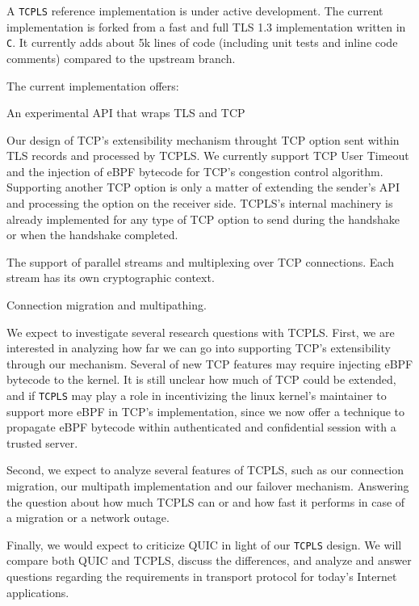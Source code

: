 
A \texttt{TCPLS} reference implementation is under active development. The
current implementation is forked from a fast and full
TLS 1.3 implementation written in \texttt{C}. It currently adds about 5k lines
of code (including unit tests and inline code comments) compared to the upstream branch.

The current implementation offers:
\begin{inparaenum}
  \item An experimental API that wraps TLS and TCP
  \item Our design of TCP's extensibility mechanism throught TCP option sent
within TLS records and processed by TCPLS. We currently support TCP User
Timeout and the injection of eBPF bytecode for TCP's congestion control
algorithm. Supporting another TCP option is only a matter of extending the sender's
API and processing the option
on the receiver side. TCPLS's internal machinery is already implemented for any
type of TCP option to send during the handshake or when the handshake completed.
  \item The support of parallel streams and multiplexing over TCP connections.
    Each stream has its own cryptographic context.
  \item Connection migration and multipathing.
\end{inparaenum}

We expect to investigate several research questions with TCPLS. First, we are
interested in analyzing how far we can go into supporting TCP's extensibility
through our mechanism. Several of new TCP features may require injecting eBPF
bytecode to the kernel. It is still unclear how much of TCP could be extended,
and if \texttt{TCPLS} may play a role in incentivizing the linux kernel's maintainer
to support more eBPF in TCP's implementation, since we now offer a technique to
propagate eBPF bytecode within authenticated and confidential session with a
trusted server.

Second, we expect to analyze several features of TCPLS, such as our
connection migration, our multipath implementation and our failover mechanism.
Answering the question about how much TCPLS can or and how fast it performs in
case of a migration or a network outage.

Finally, we would expect to criticize QUIC in light of our \texttt{TCPLS}
design. We will compare both QUIC and TCPLS, discuss the differences, and analyze
and answer questions regarding the requirements in transport protocol for today's
Internet applications.
